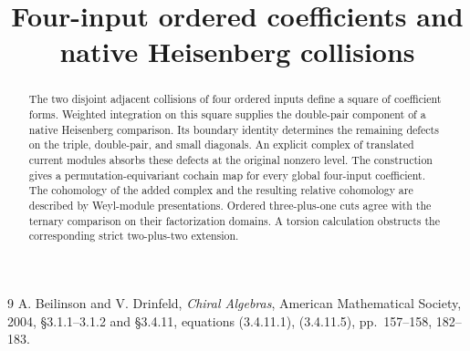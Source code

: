 \documentclass[11pt,oneside]{memoir}
\title{Four-input ordered coefficients and native Heisenberg collisions}
\author{}
\date{}
\begin{document}
\maketitle
\begin{abstract}
The two disjoint adjacent collisions of four ordered inputs define a square of coefficient forms.
Weighted integration on this square supplies the double-pair component of a native Heisenberg comparison.
Its boundary identity determines the remaining defects on the triple, double-pair, and small diagonals.
An explicit complex of translated current modules absorbs these defects at the original nonzero level.
The construction gives a permutation-equivariant cochain map for every global four-input coefficient.
The cohomology of the added complex and the resulting relative cohomology are described by Weyl-module presentations.
Ordered three-plus-one cuts agree with the ternary comparison on their factorization domains.
A torsion calculation obstructs the corresponding strict two-plus-two extension.
\end{abstract}


\begin{thebibliography}{9}
A. Beilinson and V. Drinfeld,
\emph{Chiral Algebras}, American Mathematical Society, 2004,
\S3.1.1--3.1.2 and \S3.4.11, equations (3.4.11.1), (3.4.11.5), pp.~157--158, 182--183.
\end{thebibliography}
\end{document}
